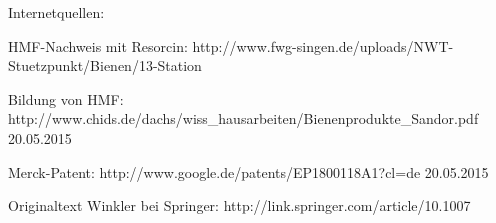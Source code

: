 Internetquellen:

HMF-Nachweis mit Resorcin:
http://www.fwg-singen.de/uploads/NWT-Stuetzpunkt/Bienen/13-Station%

Bildung von HMF:
http://www.chids.de/dachs/wiss_hausarbeiten/Bienenprodukte_Sandor.pdf 20.05.2015

Merck-Patent:
http://www.google.de/patents/EP1800118A1?cl=de 20.05.2015

Originaltext Winkler bei Springer:
http://link.springer.com/article/10.1007%